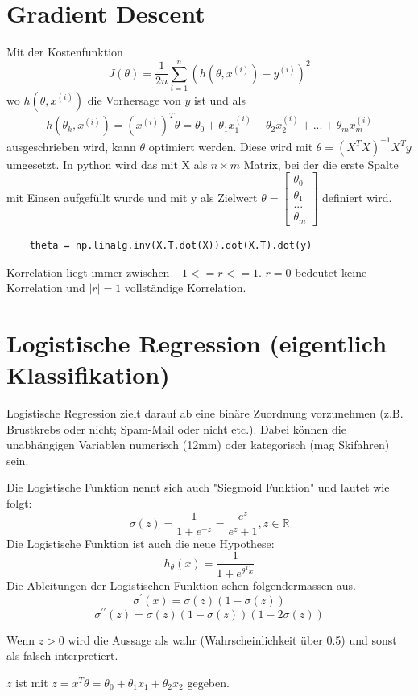 \documentclass{article}
\begin{document}
\section{Gradient Descent}
	Mit der Kostenfunktion $$J(\theta) = \frac{1}{2 n} \sum_{i=1}^{n}(h(\theta,x^{(i)})-y^{(i)})^2$$ wo $h(\theta,x^{(i)})$ die Vorhersage von $y$ ist und als $$h(\theta_k,x^{(i)})= (x^{(i)})^T\theta=\theta_0+\theta_1x_1^{(i)}+\theta_2x_2^{(i)}+...+\theta_mx_m^{(i)}$$
	ausgeschrieben wird, kann $\theta$ optimiert werden.	
	Diese wird mit $\theta = (X^T X)^{-1} X^T y$ umgesetzt. 
	In python wird das mit X als $n \times m$ Matrix, bei der die erste Spalte mit Einsen aufgefüllt wurde und mit y als Zielwert
	$\theta = 
	\begin{bmatrix}
	\theta_0 \\[0.1pt] \theta_1 \\[0.1pt] ... \\[0.1pt] \theta_m
	\end{bmatrix}$ definiert wird.
	
	\begin{lstlisting}
	theta = np.linalg.inv(X.T.dot(X)).dot(X.T).dot(y)
	\end{lstlisting}
	
	Korrelation liegt immer zwischen $-1 <= r <= 1$.
	$r = 0$ bedeutet keine Korrelation und $|r| = 1$ vollständige Korrelation.
\section{Logistische Regression (eigentlich Klassifikation)}
	Logistische Regression zielt darauf ab eine binäre Zuordnung vorzunehmen (z.B. Brustkrebs oder nicht; Spam-Mail oder nicht etc.).
	Dabei können die unabhängigen Variablen numerisch (12mm) oder kategorisch (mag Skifahren) sein.
	
	Die Logistische Funktion nennt sich auch "Siegmoid Funktion" und lautet wie folgt:
	$$\sigma(z) = \frac{1}{1+e^{-z}} = \frac{e^z}{e^z+1}, z \in \mathbb{R}$$
	Die Logistische Funktion ist auch die neue Hypothese: $$h_\theta(x)=\frac{1}{1+e^{\theta^Tx}}$$
	Die Ableitungen der Logistischen Funktion sehen folgendermassen aus.
	$$\sigma^{\prime}(x) = \sigma(z) (1-\sigma(z))$$
	$$\sigma^{\prime\prime}(z)= \sigma(z)(1-\sigma(z))(1-2\sigma(z))$$
	
	Wenn $z > 0$ wird die Aussage als wahr (Wahrscheinlichkeit über 0.5) und sonst als falsch interpretiert.
	
	$z$ ist mit $z=x^T \theta = \theta_0 + \theta_1 x_1 + \theta_2 x_2$ gegeben.
\end{document}
